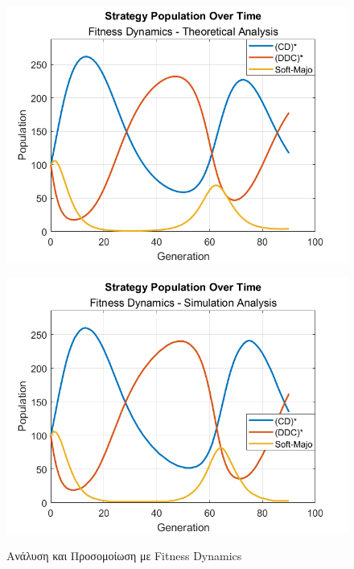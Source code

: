 \documentclass[a4paper,12pt]{article}
\begin{document}
\begin{figure}[H]
    \centering
    \begin{minipage}{0.5\linewidth}
        \centering
        \includegraphics[width=\linewidth]{Graphs/fit_the1a.png}
        \label{fig:fit_the1a}
    \end{minipage}%
    \begin{minipage}{0.5\linewidth}
        \centering
        \includegraphics[width=\linewidth]{Graphs/fit_sim1.png}
        \label{fig:fit_sim1}
    \end{minipage}
    \caption{Ανάλυση και Προσομοίωση με \foreignlanguage{english}{Fitness Dynamics}}
\end{figure}
\end{document}
